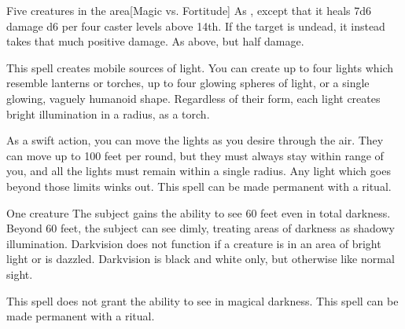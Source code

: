 \begin{spelltargets}{Five creatures in the area}[Magic vs. Fortitude]
    \spelleffect As , except that it heals 7d6 damage \add d6 per four caster levels above 14th.
    \spellsuccess If the target is undead, it instead takes that much positive damage.
    \spellfailure As above, but half damage.
\end{spelltargets}

\begin{comment}
\subsubsection{D}
\end{comment}

\spelldur{\durshort \dismissable}
\spellline
\spelleffect This spell creates mobile sources of light. You can create up to four lights which resemble lanterns or torches, up to four glowing spheres of light, or a single glowing, vaguely humanoid shape. Regardless of their form, each light creates bright illumination in a \areamed radius, as a torch.

As a swift action, you can move the lights as you desire through the air. They can move up to 100 feet per round, but they must always stay within range of you, and all the lights must remain within a single \areamed radius. Any light which goes beyond those limits winks out.
\spellnotes This spell can be made permanent with a  ritual.

\spellrng{\rngtouch}
\spelldur{\durlong}
\begin{spelltarget}{One creature}
    \spelleffect The subject gains the ability to see 60 feet even in total darkness. Beyond 60 feet, the subject can see dimly, treating areas of darkness as shadowy illumination. Darkvision does not function if a creature is in an area of bright light or is dazzled. Darkvision is black and white only, but otherwise like normal sight.
\end{spelltarget}
\spellnotes This spell does not grant the ability to see in magical darkness. This spell can be made permanent with a  ritual.


